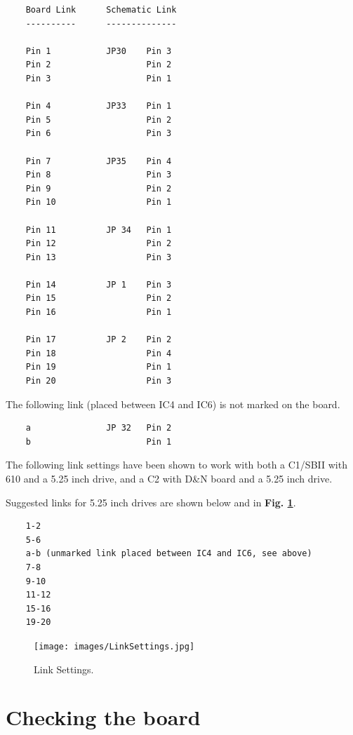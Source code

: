 \begin{BVerbatim}
    Board Link      Schematic Link
    ----------      --------------

    Pin 1           JP30    Pin 3
    Pin 2                   Pin 2
    Pin 3                   Pin 1
        
    Pin 4           JP33    Pin 1        
    Pin 5                   Pin 2
    Pin 6                   Pin 3
        
    Pin 7           JP35    Pin 4
    Pin 8                   Pin 3
    Pin 9                   Pin 2
    Pin 10                  Pin 1
        
    Pin 11          JP 34   Pin 1
    Pin 12                  Pin 2
    Pin 13                  Pin 3
        
    Pin 14          JP 1    Pin 3
    Pin 15                  Pin 2
    Pin 16                  Pin 1
        
    Pin 17          JP 2    Pin 2
    Pin 18                  Pin 4
    Pin 19                  Pin 1
    Pin 20                  Pin 3  
\end{BVerbatim}
        
The following link (placed between IC4 and IC6) is not marked on the board.

\begin{BVerbatim}
    a               JP 32   Pin 2
    b                       Pin 1
\end{BVerbatim}
        
The following link settings have been shown to work with both a C1/SBII with 610 and a 5.25 inch drive, and a C2 with D\&N board and a 5.25 inch drive.

Suggested links for 5.25 inch drives are shown below and in \textbf{Fig. \ref{fig:links}}. 

\begin{BVerbatim}
    1-2
    5-6
    a-b (unmarked link placed between IC4 and IC6, see above)
    7-8
    9-10
    11-12
    15-16
    19-20
\end{BVerbatim}

\begin{figure}[htbp]
\begin{center}
\texttt{[image: images/LinkSettings.jpg]}
\caption{Link Settings.}
\label{fig:links}
\end{center}
\end{figure}

\section{Checking the board}

